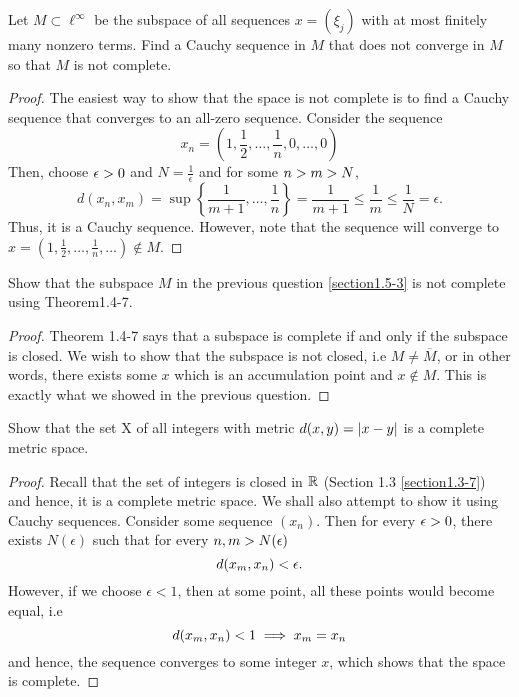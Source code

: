 \begin{question}
    Let $M \subset \ell^\infty$ be the subspace of all sequences $x = (\xi_j)$ with at most finitely many nonzero terms. Find a Cauchy sequence in $M$ that does not converge in $M$ so that $M$ is not complete.
    \label{section1.5-3}
\end{question}
\begin{proof}
    The easiest way to show that the space is not complete is to find a Cauchy sequence that converges to an all-zero sequence. Consider the sequence 
    \[x_n  = \left(1 , \frac{1}{2} , \ldots , \frac{1}{n} , 0 , \ldots , 0 \right)\]
    Then, choose $\epsilon > 0$ and $N = \frac{1}{\epsilon}$ and for some $n > m > N$,
    \[d(x_n , x_m) = \sup\left\{\frac{1}{m+1} , \ldots , \frac{1}{n}\right\} = \frac{1}{m+1} \leq \frac{1}{m} \leq \frac{1}{N} =  \epsilon.\]
    Thus, it is a Cauchy sequence. However, note that the sequence will converge to $x = \left(1 , \frac{1}{2} , \ldots , \frac{1}{n} , \ldots \right) \notin M$.
\end{proof}

\begin{question}
    Show that the subspace $M$ in the previous question \ref{section1.5-3} is not complete using Theorem1.4-7.
    \label{section1.5-4}
\end{question}
\begin{proof}
    Theorem 1.4-7 says that a subspace is complete if and only if the subspace is closed. We wish to show that the subspace is not closed, i.e $M \neq \overline{M}$, or in other words, there exists some $x$ which is an accumulation point and $x \notin M$. This is exactly what we showed in the previous question.
\end{proof}

\begin{question}
    Show that the set X of all integers with metric $d(x,y) = \left\lvert x-y \right\rvert$ is a complete metric space. 
    \label{section1.5-5}
\end{question}
\begin{proof}
    Recall that the set of integers is closed in $\mathbb{R}$ (Section 1.3 \ref{section1.3-7}) and hence, it is a complete metric space. We shall also attempt to show it using Cauchy sequences. Consider some sequence $(x_n)$. Then for every $\epsilon > 0$, there exists $N(\epsilon)$ such that for every $n,m > N(\epsilon)$
    \[d(x_m , x_n) < \epsilon.\]
    However, if we choose $\epsilon < 1$, then at some point, all these points would become equal, i.e
    \[d(x_m , x_n) < 1 \implies x_m = x_n\]
    and hence, the sequence converges to some integer $x$, which shows that the space is complete.
\end{proof}

